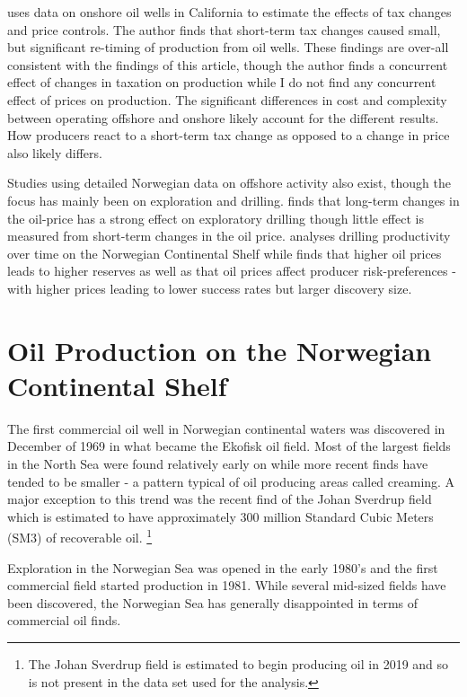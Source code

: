 \documentclass[12pt]{article}
\begin{document}
\citet{rao_taxation_2010} uses data on onshore oil wells in California to estimate the effects of tax changes and price controls. The author finds that short-term tax changes caused small, but significant re-timing of production from oil wells.  These findings are over-all consistent with the findings of this article, though the author finds a concurrent effect of changes in taxation on production while I do not find any concurrent effect of prices on production. The significant differences in cost and complexity between operating offshore and onshore likely account for the different results.  How producers react to a short-term tax change as opposed to a change in price also likely differs.

Studies using detailed Norwegian data on offshore activity also exist, though the focus has mainly been on exploration and drilling.  \citet{mohn_exploration_2008} finds that long-term changes in the oil-price has a strong effect on exploratory drilling though little effect is measured from short-term changes in the oil price.  \citet{osmundsen_exploration_2010} analyses drilling productivity over time on the Norwegian Continental Shelf while \citet{mohn_efforts_2008} finds that higher oil prices leads to higher reserves as well as that oil prices affect producer risk-preferences - with higher prices leading to lower success rates but larger discovery size.  

\section{Oil Production on the Norwegian Continental Shelf}

The first commercial oil well in Norwegian continental waters was discovered in December of 1969 in what became the Ekofisk oil field. Most of the largest fields in the North Sea were found relatively early on while more recent finds have tended to be smaller - a pattern typical of oil producing areas called creaming.  A major exception to this trend was the recent find of the Johan Sverdrup field which is estimated to have approximately 300 million Standard Cubic Meters (SM3) of recoverable oil. \footnote{The Johan Sverdrup field is estimated to begin producing oil in 2019 and so is not present in the data set used for the analysis.}  

Exploration in the Norwegian Sea was opened in the early 1980’s and the first commercial field started production in 1981.  While several mid-sized fields have been discovered, the Norwegian Sea has generally disappointed in terms of commercial oil finds.  
\end{document}
